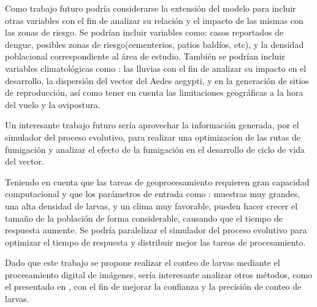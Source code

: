 Como trabajo futuro podría considerarse la extensión del modelo para incluir otras variables
con el fin de analizar su relación y el impacto de las mismas con las zonas de riesgo. Se podrían
incluir variables como: casos reportados de dengue, posibles zonas de riesgo(cementerios, patios
baldíos, etc), y la densidad poblacional correspondiente al área de estudio. También se podrían
incluir variables climatológicas como : las lluvias con el fin de analizar su impacto en el
desarrollo, la dispersión del vector del Aedes aegypti, y en la generación de sitios de
reproducción, así como tener en cuenta las limitaciones geográficas a la hora del vuelo y la
ovipostura.

Un interesante trabajo futuro sería aprovechar la información generada, por el simulador del
proceso evolutivo, para realizar una optimizacíon de las rutas de fumigación y analizar el efecto
de la fumigación en el desarrollo de ciclo de vida del vector.

Teniendo en cuenta que las tareas de geoprocesamiento requieren gran capacidad computacional y que
los parámetros de entrada como : muestras muy grandes, una alta densidad de larvas, y un
clima muy favorable, pueden hacer crecer el tamaño de la población de forma considerable, causando
que el tiempo de respuesta aumente. Se podría paralelizar el simulador del proceso evolutivo para
optimizar el tiempo de respuesta y distribuir mejor las tareas de procesamiento.

Dado que este trabajo se propone realizar el conteo de larvas mediante el procesamiento digital de
imágenes, sería interesante analizar otros métodos, como el presentado en
\cite{gonzalez2008segmentacion}, con el fin de mejorar la confianza y la precisión de conteo de
larvas.
